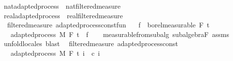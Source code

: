 \begin{isabellebody}
\isanewline
{}\isamarkupfalse%
\ nat{\isacharunderscore}{\kern0pt}adapted{\isacharunderscore}{\kern0pt}process\ {\isasymsubseteq}\ nat{\isacharunderscore}{\kern0pt}filtered{\isacharunderscore}{\kern0pt}measure%
\isadelimproof
\ %
\endisadelimproof
%
\isatagproof
\isacommand{{\isachardot}{\kern0pt}{\isachardot}{\kern0pt}}\isamarkupfalse%
%
\endisatagproof
{\isafoldproof}%
%
\isadelimproof
%
\endisadelimproof
\isanewline
{}\isamarkupfalse%
\ real{\isacharunderscore}{\kern0pt}adapted{\isacharunderscore}{\kern0pt}process\ {\isasymsubseteq}\ real{\isacharunderscore}{\kern0pt}filtered{\isacharunderscore}{\kern0pt}measure%
\isadelimproof
\ %
\endisadelimproof
%
\isatagproof
\isacommand{{\isachardot}{\kern0pt}{\isachardot}{\kern0pt}}\isamarkupfalse%
%
\endisatagproof
{\isafoldproof}%
%
\isadelimproof
%
\endisadelimproof
\isanewline
\isanewline
{}\isamarkupfalse%
\ {\isacharparenleft}{\kern0pt}\ filtered{\isacharunderscore}{\kern0pt}measure{\isacharparenright}{\kern0pt}\ adapted{\isacharunderscore}{\kern0pt}process{\isacharunderscore}{\kern0pt}const{\isacharunderscore}{\kern0pt}fun{\isacharcolon}{\kern0pt}\isanewline
\ \ \ {\isachardoublequoteopen}f\ {\isasymin}\ borel{\isacharunderscore}{\kern0pt}measurable\ {\isacharparenleft}{\kern0pt}F\ t\isanewline
\ \ \ {\isachardoublequoteopen}adapted{\isacharunderscore}{\kern0pt}process\ M\ F\ t\ {\isacharparenleft}{\kern0pt}{\isasymlambda}{\isacharunderscore}{\kern0pt}{\isachardot}{\kern0pt}\ f{\isacharparenright}{\kern0pt}{\isachardoublequoteclose}\isanewline
%
\isadelimproof
\ \ %
\endisadelimproof
%
\isatagproof
{}\isamarkupfalse%
\ measurable{\isacharunderscore}{\kern0pt}from{\isacharunderscore}{\kern0pt}subalg\ subalgebra{\isacharunderscore}{\kern0pt}F\ assms\ \isamarkupfalse%
\ {\isacharparenleft}{\kern0pt}unfold{\isacharunderscore}{\kern0pt}locales{\isacharparenright}{\kern0pt}\ blast%
\endisatagproof
{\isafoldproof}%
%
\isadelimproof
\isanewline
%
\endisadelimproof
\isanewline
{}\isamarkupfalse%
\ {\isacharparenleft}{\kern0pt}\ filtered{\isacharunderscore}{\kern0pt}measure{\isacharparenright}{\kern0pt}\ adapted{\isacharunderscore}{\kern0pt}process{\isacharunderscore}{\kern0pt}const{\isacharcolon}{\kern0pt}\isanewline
\ \ \ {\isachardoublequoteopen}adapted{\isacharunderscore}{\kern0pt}process\ M\ F\ t\ {\isacharparenleft}{\kern0pt}{\isasymlambda}i\ {\isacharunderscore}{\kern0pt}{\isachardot}{\kern0pt}\ c\ i{\isacharparenright}{\kern0pt}{\isachardoublequoteclose}%

\end{isabellebody}

